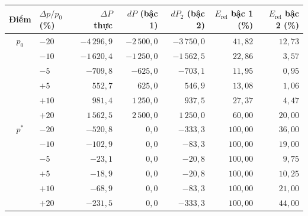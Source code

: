 
\begin{tabular}{@{}clrrrrr@{}}
\toprule
Điểm & $\Delta p/p_0$ (\%) & $\Delta P$ thực & $dP$ (bậc 1) & $dP_2$ (bậc 2) & $E_{\mathrm{rel}}$ bậc 1 (\%) & $E_{\mathrm{rel}}$ bậc 2 (\%) \\
\midrule
$p_0$ & ${-}20$ & ${-}4\,296{,}9$ & ${-}2\,500{,}0$ & ${-}3\,750{,}0$ & $41{,}82$ & $12{,}73$ \\
 & ${-}10$ & ${-}1\,620{,}4$ & ${-}1\,250{,}0$ & ${-}1\,562{,}5$ & $22{,}86$ & $3{,}57$ \\
 & ${-}5$ & ${-}709{,}8$ & ${-}625{,}0$ & ${-}703{,}1$ & $11{,}95$ & $0{,}95$ \\
 & ${+}5$ & $552{,}7$ & $625{,}0$ & $546{,}9$ & $13{,}08$ & $1{,}06$ \\
 & ${+}10$ & $981{,}4$ & $1\,250{,}0$ & $937{,}5$ & $27{,}37$ & $4{,}47$ \\
 & ${+}20$ & $1\,562{,}5$ & $2\,500{,}0$ & $1\,250{,}0$ & $60{,}00$ & $20{,}00$ \\
\midrule
$p^*$ & ${-}20$ & ${-}520{,}8$ & $0{,}0$ & ${-}333{,}3$ & $100{,}00$ & $36{,}00$ \\
 & ${-}10$ & ${-}102{,}9$ & $0{,}0$ & ${-}83{,}3$ & $100{,}00$ & $19{,}00$ \\
 & ${-}5$ & ${-}23{,}1$ & $0{,}0$ & ${-}20{,}8$ & $100{,}00$ & $9{,}75$ \\
 & ${+}5$ & ${-}18{,}9$ & $0{,}0$ & ${-}20{,}8$ & $100{,}00$ & $10{,}25$ \\
 & ${+}10$ & ${-}68{,}9$ & $0{,}0$ & ${-}83{,}3$ & $100{,}00$ & $21{,}00$ \\
 & ${+}20$ & ${-}231{,}5$ & $0{,}0$ & ${-}333{,}3$ & $100{,}00$ & $44{,}00$ \\
\bottomrule
\end{tabular}
